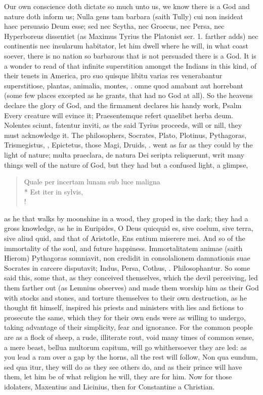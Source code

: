 {Our own conscience doth dictate so much unto us, we know there is a God
and nature doth inform us; Nulla gens tam barbara (saith Tully) cui non
insideat haec persuasio Deum esse; sed nec Scytha, nec Groecus, nec
Persa, nec Hyperboreus dissentiet (as Maximus Tyrius the Platonist ser.
1. farther adds) nec continentis nec insularum habitator, let him dwell
where he will, in what coast soever, there is no nation so barbarous
that is not persuaded there is a God. It is a wonder to read of that
infinite superstition amongst the Indians in this kind, of their tenets
in America, pro suo quisque libitu varias res venerabantur
superstitiose, plantas, animalia, montes, \etc{}. omne quod amabant aut
horrebant (some few places excepted as he grants, that had no God at
all). So the heavens declare the glory of God, and the firmament
declares his handy work, Psalm  Every creature will evince it;
Praesentemque refert quaelibet herba deum. Nolentes sciunt, fatentur
inviti, as the said Tyrius proceeds, will or nill, they must
acknowledge it. The philosophers, Socrates, Plato, Plotinus,
Pythagoras, Trismegistus, \Seneca, Epictetus, those Magi, Druids, \etc{}.
went as far as they could by the light of nature; multa
praeclara, de natura Dei seripta reliquerunt, writ many things well of
the nature of God, but they had but a confused light, a glimpse,

\begin{latin}
\begin{verse}%
Quale per incertam lunam sub luce maligna\\*
Est iter in sylvis,\\!
\end{verse}%
\end{latin}

as he that walks by moonshine in a wood, they groped in the dark; they
had a gross knowledge, as he in Euripides, O Deus quicquid es, sive
coelum, sive terra, sive aliud quid, and that of Aristotle, Ens entium
miserere mei. And so of the immortality of the soul, and future
happiness. Immortalitatem animae (saith Hierom) Pythagoras somniavit,
\Democritus{} non credidit in consolalionem damnationis suae Socrates in
carcere disputavit; Indus, Persa, Cothus, \etc{}. Philosophantur. So some
said this, some that, as they conceived themselves, which the devil
perceiving, led them farther out (as Lemnius observes) and made
them worship him as their God with stocks and stones, and torture
themselves to their own destruction, as he thought fit himself,
inspired his priests and ministers with lies and fictions to prosecute
the same, which they for their own ends were as willing to undergo,
taking advantage of their simplicity, fear and ignorance. For the
common people are as a flock of sheep, a rude, illiterate rout, void
many times of common sense, a mere beast, bellua multorum capitum, will
go whithersoever they are led: as you lead a ram over a gap by the
horns, all the rest will follow, Non qua eundum, sed qua itur,
they will do as they see others do, and as their prince will have them,
let him be of what religion he will, they are for him. Now for those
idolaters, Maxentius and Licinius, then for Constantine a Christian.

}

